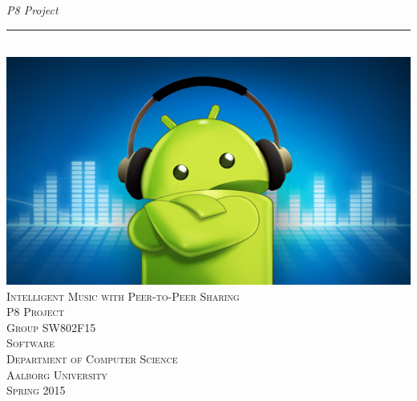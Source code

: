 \thispagestyle{empty}
\begin{flushright}
\vspace{3cm}

\phantom{hul}

\phantom{hul}

\phantom{hul}

\textsl{P8 Project} \\ \vspace{1cm}

\rule{1\textwidth}{3mm} \\ \vspace{1.5cm}
\includegraphics[width=\textwidth]{Images/frontpage.jpg}
\vspace{1.5cm} \\
\textsc{\Large Intelligent Music with Peer-to-Peer Sharing \\
P8 Project\\
Group SW802F15\\
Software\\
Department of Computer Science\\
Aalborg University\\
Spring 2015\\
~\\
}

\end{flushright}
